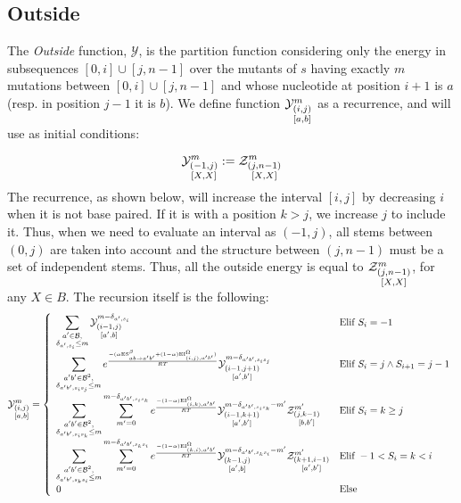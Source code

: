 \subsection{Outside}	
The \emph{Outside} function, $\mathcal Y$, is the partition function considering only the 
energy in subsequences $[0,i]\cup[j,n-1]$ over the mutants of $s$ having exactly $m$ mutations between $[0,i]\cup[j,n-1]$ and whose nucleotide at position $i+1$ is $a$ 
(resp. in position $j-1$ it is $b$).
We define function $\Y{i,j}{m}{a,b}$ as a recurrence, and will use as initial conditions:

$$
	\Y{-1,j}{m}{X,X}:=
		\displaystyle
	  \Z{j,n-1}{m}{X,X}
$$
The recurrence, as shown below, will increase the interval $[i,j]$ by decreasing $i$ when
it is not base paired. If it is with a position $k>j$, we increase $j$ to include it.
 Thus, when we need
to evaluate an interval as $(-1,j)$, all stems between $(0,j)$ are taken into account and the
structure between $(j,n-1)$ must be a set of independent stems. Thus, all the outside energy is
equal to $\Z{j,n-1}{m}{X,X}$, for any $X\in B$. The recursion itself is the following:
$$
	\Y{i,j}{m}{a,b} = \left\{
  \begin{array}{ll}
		\displaystyle
    \sum_{\substack{a'\in \B,\\ \Kron_{a',s_i}\le m}}
    \Y{i-1,j}{m- \Kron_{a',s_i}}{a',b} &
    \text{Elif }S_i=-1 \\
    \displaystyle
    \sum_{\substack{a'b'\in \B^2,\\ \Kron_{a'b',s_is_j}\le m}}
		 e^{\frac{-(\alpha \text{ES}^\beta_{a b \to a' b'}+(1-\alpha)\text{EI}^{\Omega}_{(i,j),a'b'})}{RT}}
    \Y{i-1,j+1}{m- \Kron_{a'b',s_is_j}}{a',b'} &
   	 \text{Elif }S_{i}=j \land S_{i+1}=j-1\\
		 \displaystyle
		 \sum_{\substack{a'b'\in \B^2,\\ \Kron_{a'b',s_is_k}\le m}}
		 \sum_{m'=0}^{m-\Kron_{a'b',s_is_k}}
  		 e^{\frac{-(1-\alpha)\text{EI}^{\Omega}_{(i,k),a'b'}}{RT}}
		 \Y{i-1,k+1}{m- \Kron_{a'b',s_is_k} - m'}{a',b'}
     \Z{j,k-1}{m'}{b,b'} &
		 \text{Elif }S_{i}=k \geq j\\
		 \displaystyle
		 \sum_{\substack{a'b'\in \B^2,\\ \Kron_{a'b',s_ks_i}\le m}}
		 \sum_{m'=0}^{m-\Kron_{a'b',s_ks_i}}
   	 e^{\frac{-(1-\alpha)\text{EI}^{\Omega}_{(k,i),a'b'}}{RT}}
		 \Y{k-1,j}{m- \Kron_{a'b',s_ks_i} - m'}{a',b}
     \Z{k+1,i-1}{m'}{a',b'} &
		 \text{Elif }-1 < S_{i}=k < i\\
		 0 & \text{Else}
  \end{array}\right.
$$
